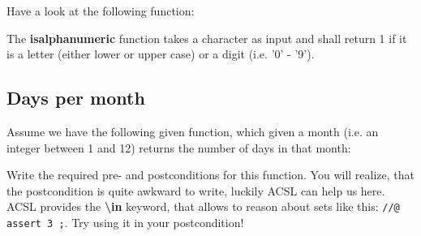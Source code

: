 Have a look at the following function:


The \textbf{is\textunderscore alphanumeric} function takes a character as input and shall return 1 if it is a letter (either lower or upper case) or a digit (i.e. '0' - '9'). 

\subsection{Days per month}

Assume we have the following given function, which given a month (i.e. an integer between 1 and 12) returns the number of days in that month:


Write the required pre- and postconditions for this function. You will realize, that the postcondition is quite awkward to write, luckily ACSL can help us here. ACSL provides the \textbf{\textbackslash in} keyword, that allows to reason about sets like this: \texttt{//@ assert 3 ;}. Try using it in your postcondition! 
